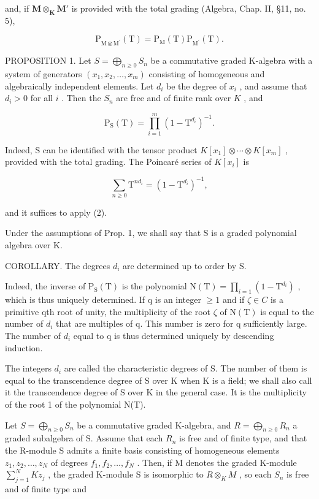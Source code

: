 and, if \(\mathbf{M} \otimes_{\mathbf{K}} \mathbf{M}'\) is provided with the total grading (Algebra, Chap. II, §11, no. 5),

\[
\mathrm{P} _ {\mathrm{M} \otimes \mathrm{M} ^ {\prime}} (\mathrm{T}) = \mathrm{P} _ {\mathrm{M}} (\mathrm{T}) \mathrm{P} _ {\mathrm{M} ^ {\prime}} (\mathrm{T}).\tag{2}
\]

PROPOSITION 1. Let \(S = \bigoplus_{n \geqslant 0} S_n\) be a commutative graded K-algebra with a system of generators \((x_1, x_2, \ldots, x_m)\) consisting of homogeneous and algebraically independent elements. Let \(d_i\) be the degree of \(x_i\) , and assume that \(d_i > 0\) for all \(i\) . Then the \(S_n\) are free and of finite rank over \(K\) , and

\[
\mathrm{P} _ {\mathrm{S}} (\mathrm{T}) = \prod_ {i = 1} ^ {m} (1 - \mathrm{T} ^ {d _ {i}}) ^ {- 1}.\tag{3}
\]

Indeed, S can be identified with the tensor product \(K[x_{1}] \otimes \cdots \otimes K[x_{m}]\) , provided with the total grading. The Poincaré series of \(K[x_{i}]\) is

\[
\sum_ {n \geqslant 0} \mathrm{T} ^ {n d _ {i}} = (1 - \mathrm{T} ^ {d _ {i}}) ^ {- 1},
\]

and it suffices to apply (2).

Under the assumptions of Prop. 1, we shall say that S is a graded polynomial algebra over K.

COROLLARY. The degrees \(d_{i}\) are determined up to order by S.

Indeed, the inverse of \(\mathrm{P}_{\mathrm{S}}(\mathrm{T})\) is the polynomial \(\mathrm{N}(\mathrm{T}) = \prod_{i=1}(1 - \mathrm{T}^{d_i})\) , which is thus uniquely determined. If q is an integer \(\geqslant 1\) and if \(\zeta \in C\) is a primitive qth root of unity, the multiplicity of the root \(\zeta\) of \(\mathrm{N}(\mathrm{T})\) is equal to the number of \(d_{i}\) that are multiples of q. This number is zero for q sufficiently large. The number of \(d_{i}\) equal to q is thus determined uniquely by descending induction.

The integers \(d_{i}\) are called the characteristic degrees of S. The number of them is equal to the transcendence degree of S over K when K is a field; we shall also call it the transcendence degree of S over K in the general case. It is the multiplicity of the root 1 of the polynomial N(T).

Let \(S = \bigoplus_{n \geqslant 0} S_n\) be a commutative graded K-algebra, and \(R = \bigoplus_{n \geqslant 0} R_n\) a graded subalgebra of S. Assume that each \(R_n\) is free and of finite type, and that the R-module S admits a finite basis consisting of homogeneous elements \(z_1, z_2, \ldots, z_N\) of degrees \(f_1, f_2, \ldots, f_N\) . Then, if M denotes the graded K-module \(\sum_{j=1}^{N} Kz_j\) , the graded K-module S is isomorphic to \(R \otimes_K M\) , so each \(S_n\) is free and of finite type and

